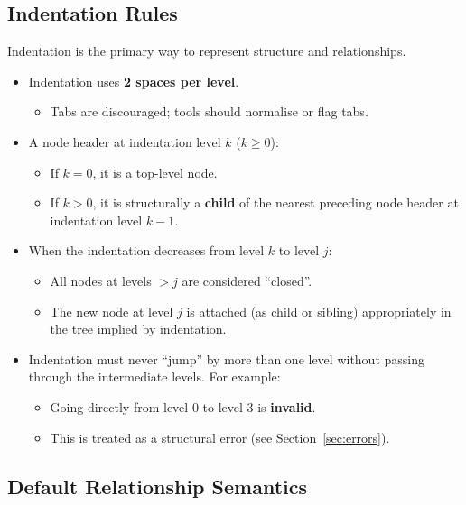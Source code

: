 \documentclass[11pt]{article}
\begin{document}
\subsection{Indentation Rules}

Indentation is the primary way to represent structure and relationships.

\begin{itemize}[leftmargin=2em]
  \item Indentation uses \textbf{2 spaces per level}.
  \begin{itemize}[leftmargin=1.5em]
    \item Tabs are discouraged; tools should normalise or flag tabs.
  \end{itemize}

  \item A node header at indentation level \(k\) (\(k \geq 0\)):
  \begin{itemize}[leftmargin=1.5em]
    \item If \(k = 0\), it is a top-level node.
    \item If \(k > 0\), it is structurally a \textbf{child} of the nearest preceding node header at indentation level \(k - 1\).
  \end{itemize}

  \item When the indentation decreases from level \(k\) to level \(j\):
  \begin{itemize}[leftmargin=1.5em]
    \item All nodes at levels \(> j\) are considered ``closed''.
    \item The new node at level \(j\) is attached (as child or sibling) appropriately in the tree implied by indentation.
  \end{itemize}

  \item Indentation must never ``jump'' by more than one level without passing through the intermediate levels. For example:
  \begin{itemize}[leftmargin=1.5em]
    \item Going directly from level 0 to level 3 is \textbf{invalid}.
    \item This is treated as a structural error (see Section~\ref{sec:errors}).
  \end{itemize}
\end{itemize}

\subsection{Default Relationship Semantics}
\end{document}

